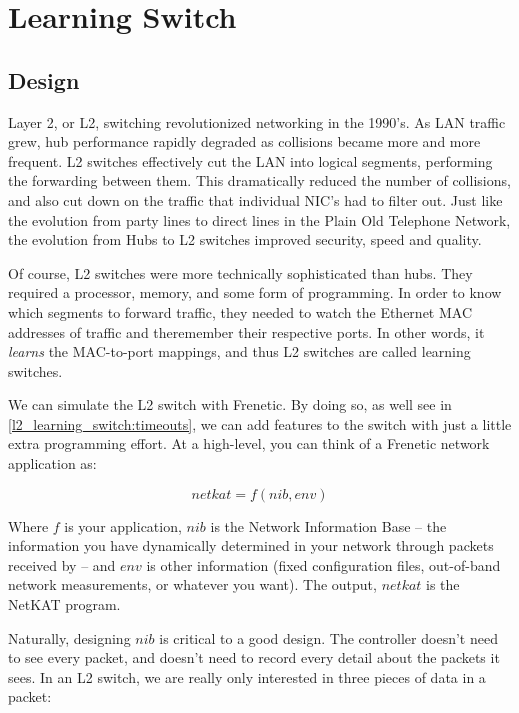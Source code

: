 
\chapter{Learning Switch}

\section{Design}
\label{l2_learning_switch:design}

Layer 2, or L2, switching revolutionized networking in the 1990's.
As LAN traffic grew, hub performance rapidly degraded as collisions became more and more frequent.
L2 switches effectively cut the LAN into logical segments, performing the forwarding between them.
This dramatically reduced the number of collisions, and also cut down on the traffic that individual
NIC's had to filter out.  Just like the evolution from party lines to direct lines in the Plain Old 
Telephone Network, the evolution from Hubs to L2 switches improved security, speed and quality.

Of course, L2 switches were more technically sophisticated than hubs.  They required a processor, memory, and 
some form of programming.  In order to know which segments to forward traffic, they needed to 
watch the Ethernet MAC addresses of traffic and theremember their respective ports.  In other words, it 
\emph{learns} the MAC-to-port mappings, and thus L2 switches are called learning switches.    

We can simulate the L2 switch with Frenetic.  By doing so, as well see in \ref{l2_learning_switch:timeouts},
we can add features to the switch with just a little extra programming effort.  At a high-level, 
you can think of a Frenetic network application as:

$$ netkat = f( nib, env ) $$

Where $f$ is your application, $nib$ is the Network Information Base -- the information you have dynamically determined in your network through
packets received by  -- and
$env$ is other information (fixed configuration files, out-of-band network measurements, or whatever you want).  
The output, $netkat$ is the NetKAT program.

Naturally, designing $nib$ is critical to a good design.  The controller doesn't need to see every packet, 
and doesn't need
to record every detail about the packets it sees.  In an L2 switch, we are really only interested in three 
pieces of data in a packet:

